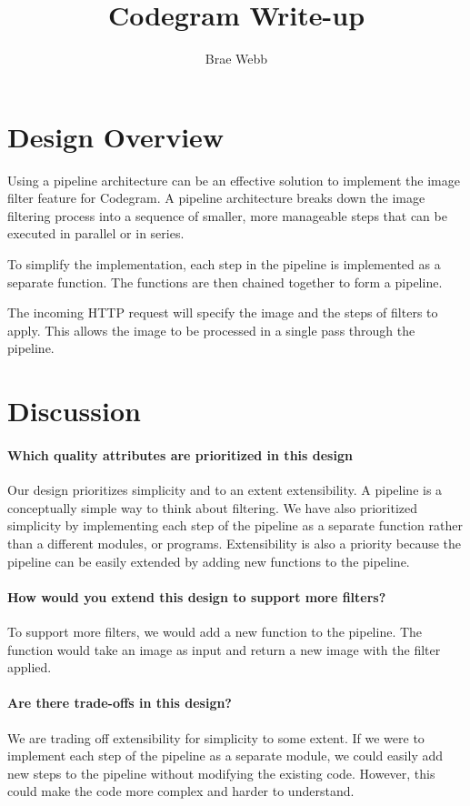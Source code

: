 \documentclass{csse4400}
\title{Codegram Write-up}
\author{Brae Webb}
\date{\week{2}}
\begin{document}
\maketitle

\section{Design Overview}

Using a pipeline architecture can be an effective solution to implement the image filter feature for Codegram.
A pipeline architecture breaks down the image filtering process into a sequence of smaller,
more manageable steps that can be executed in parallel or in series.

To simplify the implementation,
each step in the pipeline is implemented as a separate function.
The functions are then chained together to form a pipeline.

The incoming HTTP request will specify the image and the steps of filters to apply.
This allows the image to be processed in a single pass through the pipeline.

\section{Discussion}

\paragraph{Which quality attributes are prioritized in this design}
Our design prioritizes simplicity and to an extent extensibility.
A pipeline is a conceptually simple way to think about filtering.
We have also prioritized simplicity by implementing each step of the pipeline as a separate function rather than a different modules, or programs.
Extensibility is also a priority because the pipeline can be easily extended by adding new functions to the pipeline.

\paragraph{How would you extend this design to support more filters?}
To support more filters, we would add a new function to the pipeline.
The function would take an image as input and return a new image with the filter applied.

\paragraph{Are there trade-offs in this design?}
We are trading off extensibility for simplicity to some extent.
If we were to implement each step of the pipeline as a separate module, we could easily add new steps to the pipeline without modifying the existing code.
However, this could make the code more complex and harder to understand.
\end{document}
